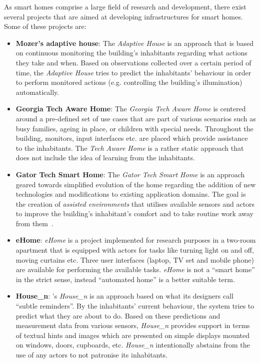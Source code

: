 As smart homes comprise a large field of research and development, there exist several projects that are aimed at developing infrastructures for smart homes. Some of these projects are:
\begin{itemize}
  \item \textbf{Mozer's adaptive house}: The \emph{Adaptive House} is an approach that is based on continuous monitoring the building's inhabitants regarding what actions they take and when. Based on observations collected over a certain period of time, the \emph{Adaptive House} tries to predict the inhabitants' behaviour in order to perform monitored actions (e.g. controlling the building's illumination) automatically.~\cite{adaptivehouse}
  \item \textbf{Georgia Tech Aware Home}: The \emph{Georgia Tech Aware Home} is centered around a pre-defined set of use cases that are part of various scenarios such as busy families, ageing in place, or children with special needs. Throughout the building, monitors, input interfaces etc. are placed which provide assistance to the inhabitants. The \emph{Tech Aware Home} is a rather static approach that does not include the idea of learning from the inhabitants.~\cite{techawarehome}
  \item \textbf{Gator Tech Smart Home}: The \emph{Gator Tech Smart Home} is an approach geared towards simplified evolution of the home regarding the addition of new technologies and modifications to existing application domains. The goal is the creation of \emph{assisted environments} that utilises available sensors and actors to improve the building's inhabitant's comfort and to take routine work away from them~\cite{gator_tech}.
  \item \textbf{eHome}: \emph{eHome} is a project implemented for research purposes in a two-room apartment that is equipped with actors for tasks like turning light on and off, moving curtains etc. Three user interfaces (laptop, TV set and mobile phone) are available for performing the available tasks. \emph{eHome} is not a ``smart home'' in the strict sense, instead ``automated home'' is a better suitable term.~\cite{ehome}
  \item \textbf{House\_n}: 's \emph{House\_n} is an approach based on what its designers call ``subtle reminders''. By the inhabitants' current behaviour, the system tries to predict what they are about to do. Based on these predictions and measurement data from various sensors, \emph{House\_n} provides support in terms of textual hints and images which are presented on simple displays mounted on windows, doors, cupboards, etc. \emph{House\_n} intentionally abstains from the use of any actors to not patronise its inhabitants.~\cite{housen}
\end{itemize}

